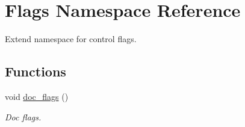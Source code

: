 \hypertarget{namespaceFlags}{}\section{Flags Namespace Reference}
\label{namespaceFlags}


Extend namespace for control flags.  


\subsection*{Functions}
\begin{DoxyCompactItemize}
\item 
void \hyperlink{namespaceFlags_aa7e90522c3f7fbac06fa93f61d88bbd8}{doc\+\_\+flags} ()
\begin{DoxyCompactList}\small\item\em Doc flags. \end{DoxyCompactList}\end{DoxyCompactItemize}
